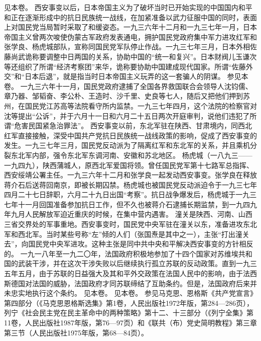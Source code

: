 \begin{maonote}
见本卷。
西安事变以后，日本帝国主义为了破坏当时已开始实现的中国国内和平和正在逐渐形成中的抗日民族统一战线，在加紧准备以武力征服中国的同时，表面上对国民党当局暂时采取了和缓姿态。一九三六年十二月和一九三七年一月，日本帝国主义曾两次唆使伪蒙古军政府发表通电，拥护国民党政府集中军力进攻红军和张学良、杨虎城部队，宣称同国民党军队停止作战。一九三七年三月，日本外相佐藤尚武诡称要调整中日两国的关系，协助中国的“统一和复兴”。日本财阀儿玉谦次等还组织了所谓“经济考察团”来华，诡称要协助中国建成现代国家。所谓“佐藤外交”和“日本后退”，就是指当时日本帝国主义玩弄的这一套骗人的阴谋。
参见本卷。
一九三六年十一月，国民党政府逮捕了全国各界救国联合会领导人沈钧儒、章乃器、邹韬奋、李公朴、王造时、沙千里、史良等七人，随后又把他们押到苏州，在国民党江苏高等法院看守所内监禁。一九三七年四月，这个法院的检察官对沈等提出“公诉”，并于六月十一日和六月二十五日两次开庭审判，说他们违犯了所谓“危害民国紧急治罪法”。
西安事变以前，东北军驻在陕西、甘肃境内，同西北红军直接接触，深受中国共产党抗日民族统一战线政策的影响，促成了西安事变的发生。一九三七年三月，国民党反动派为了隔离红军和东北军的关系，并且乘机分裂东北军内部，强令东北军东调河南、安徽和苏北地区。
杨虎城（一八九三——一九四九），陕西蒲城人，原西北军爱国将领。曾任国民党军第十七路军总指挥、西安绥靖公署主任。一九三六年十二月和张学良一起发动西安事变。张学良在释放蒋介石后送蒋回南京，即被长期囚禁。杨虎城也被国民党反动派迫令于一九三七年四月二十七日辞职，六月二十九日出国“考察”。抗日战争爆发后，杨虎城于一九三七年十一月回国准备参加抗日工作，但不久也被蒋介石逮捕长期监禁，到一九四九年九月人民解放军迫近重庆的时候，在集中营内遇害。
潼关是陕西、河南、山西三省交界处的军事重地。西安事变时，国民党中央军驻在潼关以东，准备进攻东北军和西北军。当时某些号称“左”倾的人们（张国焘是其中之一），主张“打出潼关去”，向国民党中央军进攻。这种主张是同中共中央和平解决西安事变的方针相反的。
一九一八年至一九二〇年，法国政府积极地参加了十四个国家对苏维埃共和国的武装干涉，并在这次干涉失败以后继续执行孤立苏联的反动政策。直到一九三五年五月，由于苏联的日益强大及其和平外交政策在法国人民中的影响，由于法西斯德国对法国的威胁，法国政府才同苏联缔结了互助条约。但是，法国政府后来并未忠实地执行这个条约。
见本卷。
见本卷。
参见马克思、恩格斯《共产党宣言》第四部分（《马克思恩格斯选集》第1卷，人民出版社1972年版，第284—286页），列宁《社会民主党在民主革命中的两种策略》第十二、十三部分（《列宁全集》第11卷，人民出版社1987年版，第76—97页）和《联共（布）党史简明教程》第三章第三节（人民出版社1975年版，第68—84页）。

\end{maonote}

